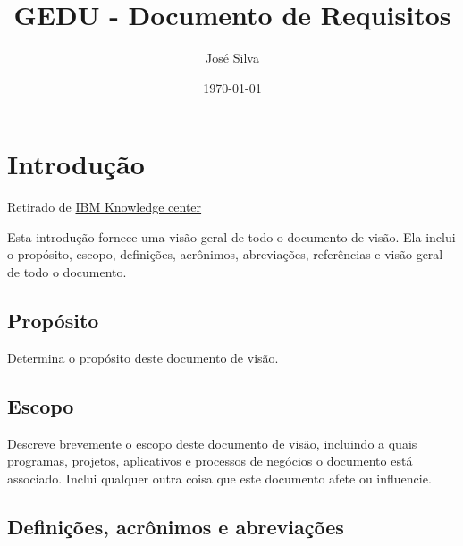 \documentclass{report}
\title{GEDU - Documento de Requisitos}
\author{José Silva}
\date{\today}
\begin{document}
\thispagestyle{empty}
\maketitle
\newpage

\setcounter{page}{1}
\tableofcontents
\newpage

\listoffigures
\newpage

\listoftables
\newpage

\setcounter{page}{1}

\chapter{Introdução}


Retirado de \href{https://www.ibm.com/support/knowledgecenter/pt-br/SSWMEQ_4.0.6/com.ibm.rational.rrm.help.doc/topics/r_vision_doc.html}{IBM Knowledge center}

Esta introdução fornece uma visão geral de todo o documento de visão. Ela
inclui o propósito, escopo, definições, acrônimos, abreviações, referências e
visão geral de todo o documento.

\section{Propósito}

Determina o propósito deste documento de visão.

\section{Escopo}

Descreve brevemente o escopo deste documento de visão, incluindo a quais
programas, projetos, aplicativos e processos de negócios o documento está
associado. Inclui qualquer outra coisa que este documento afete ou influencie.

\section{Definições, acrônimos e abreviações}
\end{document}
